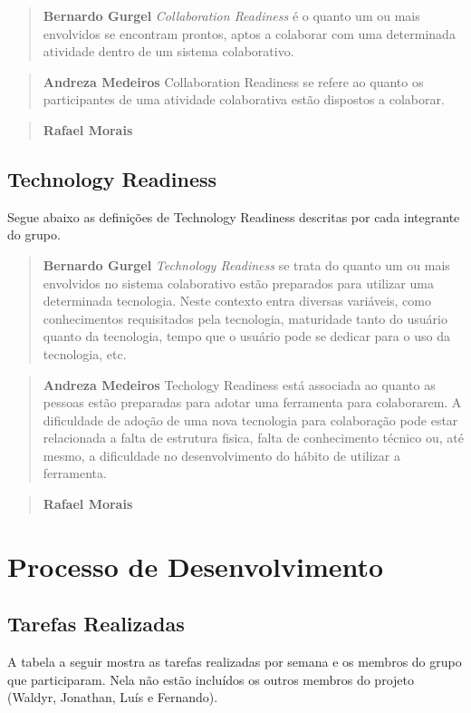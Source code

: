 \documentclass{acm_proc_article-sp}
\begin{document}
\begin{quote}\textbf{Bernardo Gurgel}
\textsl{Collaboration Readiness} é o quanto um ou mais envolvidos se encontram prontos, aptos a colaborar com uma determinada atividade dentro de um sistema colaborativo.
\end{quote}

\begin{quote}\textbf{Andreza Medeiros}
Collaboration Readiness se refere ao quanto os participantes de uma atividade colaborativa estão dispostos a colaborar.
\end{quote}

\begin{quote}\textbf{Rafael Morais}
\end{quote}

\subsection{Technology Readiness}
Segue abaixo as definições de Technology Readiness descritas por cada integrante do grupo.

\begin{quote}\textbf{Bernardo Gurgel}
\textsl{Technology Readiness} se trata do quanto um ou mais envolvidos no sistema colaborativo estão preparados para utilizar uma determinada tecnologia. Neste contexto entra diversas variáveis, como conhecimentos requisitados pela tecnologia, maturidade tanto do usuário quanto da tecnologia, tempo que o usuário pode se dedicar para o uso da tecnologia, etc.
\end{quote}

\begin{quote}\textbf{Andreza Medeiros}
Techology Readiness está associada ao quanto as pessoas estão preparadas para adotar uma ferramenta para colaborarem. A dificuldade de adoção de uma nova tecnologia para colaboração pode estar relacionada a falta de estrutura fisica, falta de conhecimento técnico ou, até mesmo, a dificuldade no desenvolvimento do hábito de utilizar a ferramenta.
\end{quote}

\begin{quote}\textbf{Rafael Morais}
\end{quote}

\section{Processo de Desenvolvimento}
\subsection{Tarefas Realizadas}
A tabela a seguir mostra as tarefas realizadas por semana e os membros do grupo que participaram.
Nela não estão incluídos os outros membros do projeto (Waldyr, Jonathan, Luís e Fernando).
\end{document}
